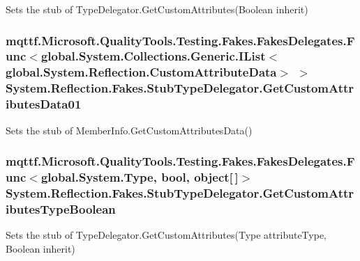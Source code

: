 Sets the stub of Type\-Delegator.\-Get\-Custom\-Attributes(\-Boolean inherit)

\hypertarget{class_system_1_1_reflection_1_1_fakes_1_1_stub_type_delegator_a0745b0be8941915bbbf37cb4d4629146}{
\subsubsection[{Get\-Custom\-Attributes\-Data01}]{\setlength{\rightskip}{0pt plus 5cm}mqttf.\-Microsoft.\-Quality\-Tools.\-Testing.\-Fakes.\-Fakes\-Delegates.\-Func$<$global.\-System.\-Collections.\-Generic.\-I\-List$<$global.\-System.\-Reflection.\-Custom\-Attribute\-Data$>$ $>$ System.\-Reflection.\-Fakes.\-Stub\-Type\-Delegator.\-Get\-Custom\-Attributes\-Data01}}\label{class_system_1_1_reflection_1_1_fakes_1_1_stub_type_delegator_a0745b0be8941915bbbf37cb4d4629146}


Sets the stub of Member\-Info.\-Get\-Custom\-Attributes\-Data()

\hypertarget{class_system_1_1_reflection_1_1_fakes_1_1_stub_type_delegator_a81381ffceb6ab3bc9f60dc9b6868e69b}{
\subsubsection[{Get\-Custom\-Attributes\-Type\-Boolean}]{\setlength{\rightskip}{0pt plus 5cm}mqttf.\-Microsoft.\-Quality\-Tools.\-Testing.\-Fakes.\-Fakes\-Delegates.\-Func$<$global.\-System.\-Type, bool, object\mbox{[}$\,$\mbox{]}$>$ System.\-Reflection.\-Fakes.\-Stub\-Type\-Delegator.\-Get\-Custom\-Attributes\-Type\-Boolean}}\label{class_system_1_1_reflection_1_1_fakes_1_1_stub_type_delegator_a81381ffceb6ab3bc9f60dc9b6868e69b}


Sets the stub of Type\-Delegator.\-Get\-Custom\-Attributes(\-Type attribute\-Type, Boolean inherit)

